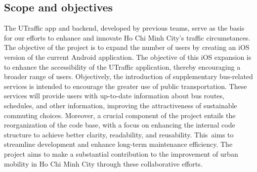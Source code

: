 \subsection{Scope and objectives}

The UTraffic app and backend, developed by previous teams, serve as the basis for our efforts to enhance and innovate Ho Chi Minh City's traffic circumstances. The objective of the project is to expand the number of users by creating an iOS version of the current Android application. The objective of this iOS expansion is to enhance the accessibility of the UTraffic application, thereby encouraging a broader range of users. Objectively, the introduction of supplementary bus-related services is intended to encourage the greater use of public transportation. These services will provide users with up-to-date information about bus routes, schedules, and other information, improving the attractiveness of sustainable commuting choices. Moreover, a crucial component of the project entails the reorganization of the code base, with a focus on enhancing the internal code structure to achieve better clarity, readability, and reusability. This aims to streamline development and enhance long-term maintenance efficiency. The project aims to make a substantial contribution to the improvement of urban mobility in Ho Chi Minh City through these collaborative efforts.
